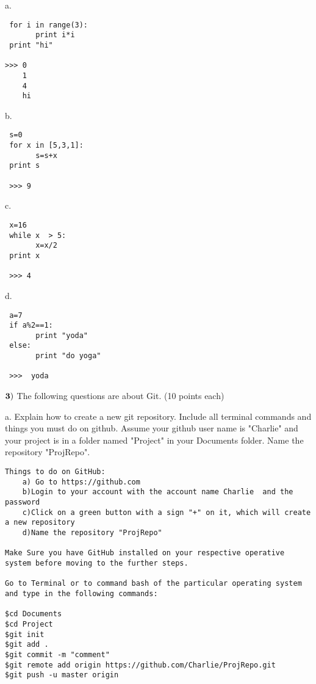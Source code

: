 \documentclass{article}
\begin{document}
 a.   \begin{verbatim}
 for i in range(3):
       print i*i
 print "hi"
 
>>> 0
    1
    4
    hi
 \end{verbatim}
 \vspace{1cm}
 
 b.  \begin{verbatim}
 s=0
 for x in [5,3,1]:
       s=s+x
 print s
 
 >>> 9
 \end{verbatim}
 \vspace{1cm}
 
 c.  \begin{verbatim}
 x=16
 while x  > 5:
       x=x/2
 print x
 
 >>> 4
 \end{verbatim}
 \vspace{1cm}
 
 d.   \begin{verbatim}
 a=7
 if a%2==1:
       print "yoda"
 else:
       print "do yoga"
       
 >>>  yoda      
 \end{verbatim}
 \vspace{1cm}
  \newpage

  
  $\bf{3)}$  The following questions are about Git. (10 points each)
  \vspace{0.5cm}
    
  a.  Explain how to create a new git repository.  Include all terminal commands and things you must do on github.  Assume your github user name is "Charlie" and your project is in a folder named "Project" in your Documents folder.  Name the repository "ProjRepo".
   
   \begin{verbatim}
Things to do on GitHub:
    a) Go to https://github.com
    b)Login to your account with the account name Charlie  and the password
    c)Click on a green button with a sign "+" on it, which will create a new repository
    d)Name the repository "ProjRepo"
    
Make Sure you have GitHub installed on your respective operative system before moving to the further steps.

Go to Terminal or to command bash of the particular operating system and type in the following commands:

$cd Documents
$cd Project
$git init
$git add .
$git commit -m "comment"
$git remote add origin https://github.com/Charlie/ProjRepo.git
$git push -u master origin 
   \end{verbatim}
  
\end{document}
